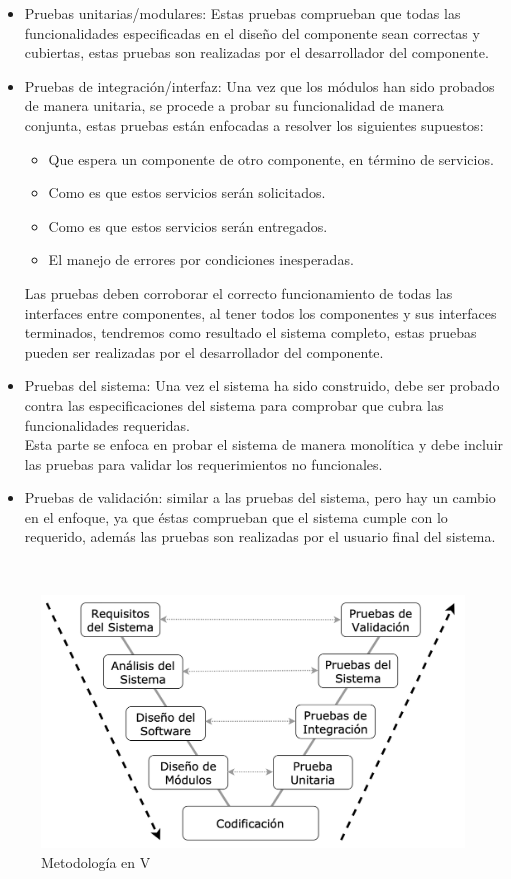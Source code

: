 \begin{itemize}

    \item Pruebas unitarias/modulares: Estas pruebas comprueban que todas las funcionalidades especificadas en el diseño del componente sean correctas y cubiertas, estas pruebas son realizadas por el desarrollador del componente.
    
    \item Pruebas de integración/interfaz: Una vez que los módulos han sido probados de manera unitaria, se procede a probar su funcionalidad de manera conjunta, estas pruebas están enfocadas a resolver los siguientes supuestos:
    
    \begin{itemize}
        \item Que espera un componente de otro componente, en término de servicios.
        \item Como es que estos servicios serán solicitados.
        \item Como es que estos servicios serán entregados.
        \item El manejo de errores por condiciones inesperadas.
    \end{itemize}
    
    Las pruebas deben corroborar el correcto funcionamiento de todas las interfaces entre componentes, al tener todos los componentes y sus interfaces terminados, tendremos como resultado el sistema completo, estas pruebas pueden ser realizadas por el desarrollador del componente.
    
    \item Pruebas del sistema: Una vez el sistema ha sido construido, debe ser probado contra las especificaciones del sistema para comprobar que cubra las funcionalidades requeridas.\\
    Esta parte se enfoca en probar el sistema de manera monolítica y debe incluir las pruebas para validar los requerimientos no funcionales.

    \item Pruebas de validación: similar a las pruebas del sistema, pero hay un cambio en el enfoque, ya que éstas comprueban que el sistema cumple con lo requerido, además las pruebas son realizadas por el usuario final del sistema.

\end{itemize}

\\
\begin{figure}[H]
	\centering
	\includegraphics[scale=.4]{Capitulo3/img/vmodel.png}
	\caption{Metodología en V}
	\label{fig:ModeloIncremental}
\end{figure}

